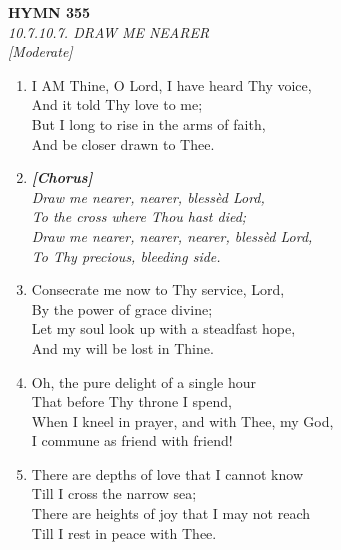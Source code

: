 \newpage
\begin{center}
    {\Large \textbf{HYMN 355}}
    \\
    \textit{10.7.10.7. DRAW ME NEARER}
    \\
    \textit{\small [Moderate]}
\end{center}
\vspace{1em}

\begin{enumerate}
    \item I AM Thine, O Lord, I have heard Thy voice, \\
        And it told Thy love to me; \\
        But I long to rise in the arms of faith, \\
        And be closer drawn to Thee.

    \item[] \vspace{0.4em}
    \textbf{\textit{[Chorus]}} \\
    \textit{Draw me nearer, nearer, bless\`ed Lord,} \\
    \textit{To the cross where Thou hast died;} \\
    \textit{Draw me nearer, nearer, nearer, bless\`ed Lord,} \\
    \textit{To Thy precious, bleeding side.}
    \vspace{0.4em}

    \item Consecrate me now to Thy service, Lord, \\
        By the power of grace divine; \\
        Let my soul look up with a steadfast hope, \\
        And my will be lost in Thine.

    \item Oh, the pure delight of a single hour \\
        That before Thy throne I spend, \\
        When I kneel in prayer, and with Thee, my God, \\
        I commune as friend with friend!

    \item There are depths of love that I cannot know \\
        Till I cross the narrow sea; \\
        There are heights of joy that I may not reach \\
        Till I rest in peace with Thee.

\end{enumerate}

